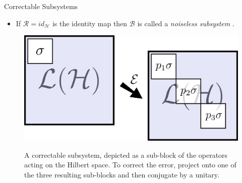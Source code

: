 \documentclass[final]{beamer}
\newcommand{\cl}[1]{\mathcal{#1}}
\newlength{\onecolwid}
\begin{document}
\begin{frame}[t]
\begin{columns}[t]
\begin{column}{\onecolwid}
\begin{block}{Correctable Subsystems}
{\begin{itemize}
\begin{enumerate}
            \item $\,$Conjugate by a unitary (which can depend on the result \\ $\,$of the measurement).
          \end{enumerate}
          \item If $\cl{R} = id_\cl{H}$ is the identity map then $\cl{B}$ is called a \emph{noiseless subsystem} \cite{zanardi97}.
        \end{itemize}
        \vspace{0.25in}
        \begin{figure}
          \begin{center}
            \includegraphics[width=10in]{code.png} \\
            \caption{A correctable subsystem, depicted as a sub-block of the operators acting on the Hilbert space. To correct the error, project onto one of the three resulting sub-blocks and then conjugate by a unitary.}
            \label{fig:corrSubsys}
          \end{center}
        \end{figure}}
      \end{block}
    \end{column}


\end{columns}
\end{frame}
\end{document}
